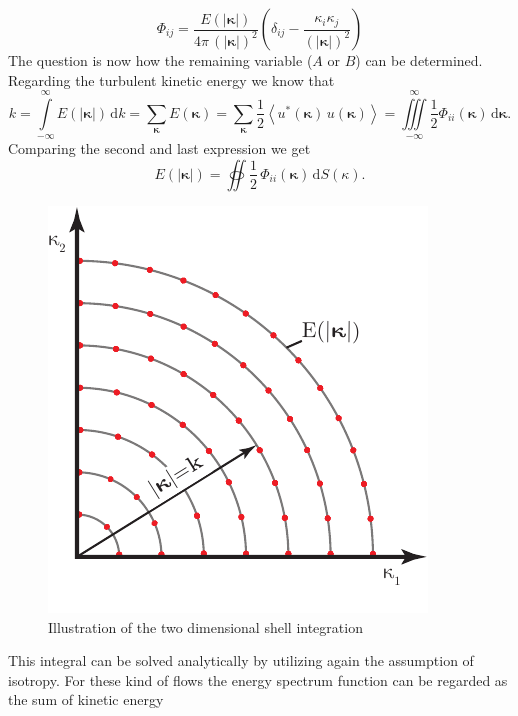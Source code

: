 \documentclass[preprint,12pt,ntfdMod]{elsarticle}
\begin{document}
\begin{par}
  \begin{equation}
  	\Phi_{ij}=\frac{E(|\boldsymbol\kappa|)}{4\pi\,(|\boldsymbol\kappa|)^2}\left(\delta_{ij}
  	-\frac{\kappa_i\kappa_j}{(|\boldsymbol\kappa|)^2}\right)
  \end{equation}
The question is now how the remaining variable ($A$ or $B$) can be determined. Regarding the turbulent kinetic
energy we know that
  \begin{equation}
      \label{eq:exp_for_k}
      k=\int\limits_{-\infty}^{\infty}E(|\boldsymbol\kappa|)\,\mathrm{d}k
      =\sum\limits_{\boldsymbol\kappa}E(\boldsymbol\kappa)
      =\sum\limits_{\boldsymbol\kappa}\frac{1}{2}\left<u^{*}(\boldsymbol\kappa)\,u(\boldsymbol\kappa)\right>
      =\iiint\limits_{-\infty}^{\infty}\frac{1}{2}\Phi_{ii}(\boldsymbol\kappa)\,\mathrm{d}\boldsymbol\kappa.
  \end{equation}
Comparing the second and last expression we get
  \begin{equation}
      E(|\boldsymbol\kappa|)=\oiint\frac{1}{2}\,\Phi_{ii}(\boldsymbol\kappa)\,\mathrm{d}S(\kappa).
  \end{equation}
  \begin{figure}[t!]
      \centering
      \includegraphics[scale=1]{shell_integration}
      \caption{Illustration of the two dimensional shell integration}
      \label{fig:shell_int}
  \end{figure}
This integral can be solved analytically by utilizing again the assumption of isotropy.
For these kind of flows the energy spectrum function can be regarded as the sum of kinetic energy

\end{par}
\end{document}
